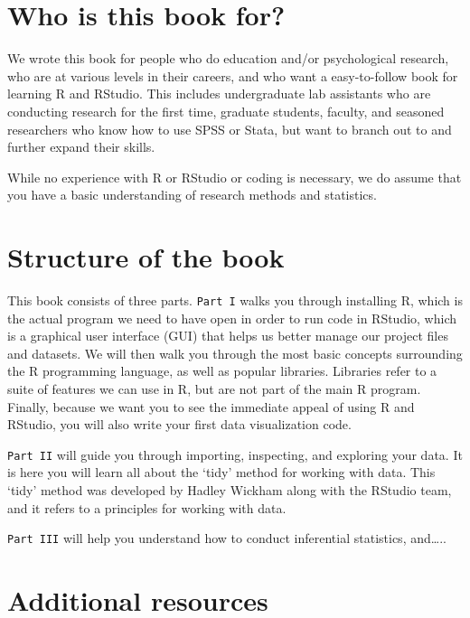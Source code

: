 \documentclass[
]{book}
\begin{document}
\hypertarget{who-is-this-book-for}{%
\section{Who is this book for?}\label{who-is-this-book-for}}

We wrote this book for people who do education and/or psychological research, who are at various levels in their careers, and who want a easy-to-follow book for learning R and RStudio. This includes undergraduate lab assistants who are conducting research for the first time, graduate students, faculty, and seasoned researchers who know how to use SPSS or Stata, but want to branch out to and further expand their skills.

While no experience with R or RStudio or coding is necessary, we do assume that you have a basic understanding of research methods and statistics.

\hypertarget{structure-of-the-book}{%
\section{Structure of the book}\label{structure-of-the-book}}

This book consists of three parts. \texttt{Part\ I} walks you through installing R, which is the actual program we need to have open in order to run code in RStudio, which is a graphical user interface (GUI) that helps us better manage our project files and datasets. We will then walk you through the most basic concepts surrounding the R programming language, as well as popular libraries. Libraries refer to a suite of features we can use in R, but are not part of the main R program. Finally, because we want you to see the immediate appeal of using R and RStudio, you will also write your first data visualization code.

\texttt{Part\ II} will guide you through importing, inspecting, and exploring your data. It is here you will learn all about the `tidy' method for working with data. This `tidy' method was developed by Hadley Wickham along with the RStudio team, and it refers to a principles for working with data.

\texttt{Part\ III} will help you understand how to conduct inferential statistics, and\ldots..

\hypertarget{additional-resources}{%
\section{Additional resources}\label{additional-resources}}
\end{document}
